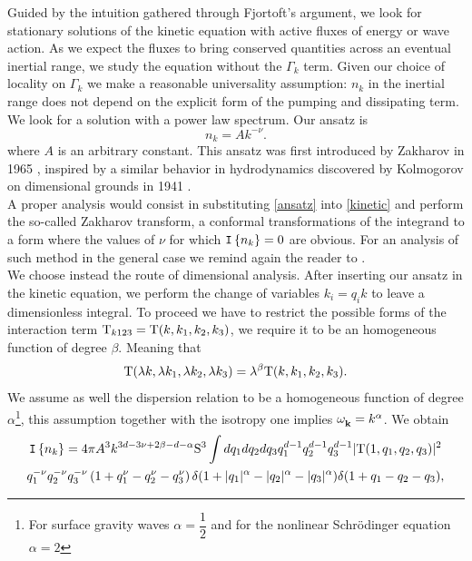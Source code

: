Guided by the intuition gathered through Fjortoft's argument, we look for stationary solutions of the kinetic equation with active fluxes of energy or wave action. 
As we expect the fluxes to bring conserved quantities across an eventual inertial range, we study the equation without the $\Gamma_k$ term. Given our choice of locality
on $\Gamma_k$ we make a reasonable universality assumption: $n_k$ in the inertial range does not depend on the explicit form of the pumping and dissipating term.\\
We look for a solution with a power law spectrum. Our ansatz is  
\begin{equation}
    n_k = A k^{-\nu}.
    \label{ansatz}
\end{equation}
where $A$ is an arbitrary constant. 
This ansatz was first introduced by Zakharov in 1965 \cite{Zakharov1965}, inspired by a similar behavior in hydrodynamics discovered by Kolmogorov on dimensional grounds 
in 1941 \cite{1991}.\\
A proper analysis would consist in substituting \eqref{ansatz} into \eqref{kinetic} and perform the so-called Zakharov transform, a conformal transformations of the integrand to a form where 
the values of $\nu$ for which $\mathtt{I}\left\{n_k\right\}= 0$ are obvious. For an analysis of such method in the general case we remind again the reader to \cite{Zakharov}. \\
We choose instead the route of dimensional analysis. After inserting our ansatz in the kinetic equation, we perform the change of variables $k_i = q_i k$ to leave a 
dimensionless integral. To proceed we have to restrict the possible forms of the interaction term $\mathrm{T}_{k123} = \mathrm{T}(k, k_1, k_2, k_3) $, we require it to be an homogeneous 
function of degree $\beta$. Meaning that
\begin{equation}
    \mathrm{T}(\lambda k, \lambda k_1,\lambda k_2,\lambda k_3) = \lambda^\beta \mathrm{T}(k, k_1, k_2, k_3).
\end{equation}
We assume as well the dispersion relation to be a homogeneous function of degree $\alpha$\footnote{For surface gravity waves $\alpha = \dfrac{1}{2}$ and for the 
nonlinear Schrödinger equation $\alpha = 2$}, this assumption together with the isotropy one implies $\omega^{}_{\mathbf{k}} = k^{\alpha}$. We obtain 
\begin{multline}
    \mathtt{I}\left\{n_k\right\}= 4\pi A^3 k^{3d - 3\nu + 2\beta - d - \alpha} \mathrm{S}^3 \int dq_1 dq_2 dq_3 q^{d-1}_1 q ^{d-1}_2 q^{d-1}_3 |\mathrm{T}(1, q_1, q_2, q_3)|^2 \\
    q_1^{-\nu}q_2^{-\nu}
    q_3^{-\nu}\left(1 + q_1^\nu - q_2^\nu - q_3^\nu \right) \delta (1 + |q_1|^\alpha - |q_2|^\alpha -|q_3|^\alpha)\delta(1 + q_1 - q_2 -q_3),
\end{multline} 
